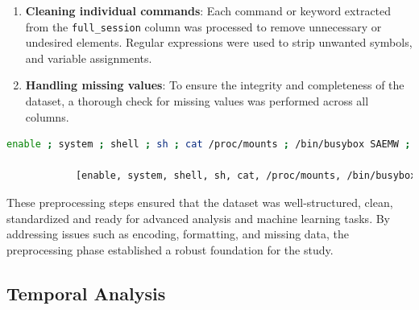 \begin{enumerate}
            \item \textbf{Cleaning individual commands}: Each command or keyword extracted from the \texttt{full\_session} column was processed to remove unnecessary or undesired elements. Regular expressions were used to strip unwanted symbols, and variable assignments. 
            
            \vspace{0.2em}
            
            \item \textbf{Handling missing values}: 
            To ensure the integrity and completeness of the dataset, a thorough check for missing values was performed across all columns.
            
        \end{enumerate}
        
        \begin{lstlisting}[language=sh, caption={Dataset Processing}, label={lst:dataset-processing}]
            enable ; system ; shell ; sh ; cat /proc/mounts ; /bin/busybox SAEMW ; cd /dev/shm ; cat .s || cp /bin/echo .s ; /bin/busybox SAEMW ; tftp ; wget ; /bin/busybox SAEMW ; dd bs=52 count=1 if=.s || cat .s || while read i ; do echo $i ; done < .s ; /bin/busybox SAEMW ; rm .s ; exit ;
            
            [enable, system, shell, sh, cat, /proc/mounts, /bin/busybox, SAEMW, cd, /dev/shm, cat, .s, cp, /bin/echo, .s, /bin/busybox, SAEMW, tftp, wget , /bin/busybox, SAEMW, dd, bs, count, if, cat, .s, while, read, i, do, echo, i, done, .s, /bin/busybox, SAEMW, rm, .s, exit]
        \end{lstlisting}
        

        These preprocessing steps ensured that the dataset was well-structured, clean, standardized and ready for advanced analysis and machine learning tasks. By addressing issues such as encoding, formatting, and missing data, the preprocessing phase established a robust foundation for the study.

    \subsection{Temporal Analysis}
    
